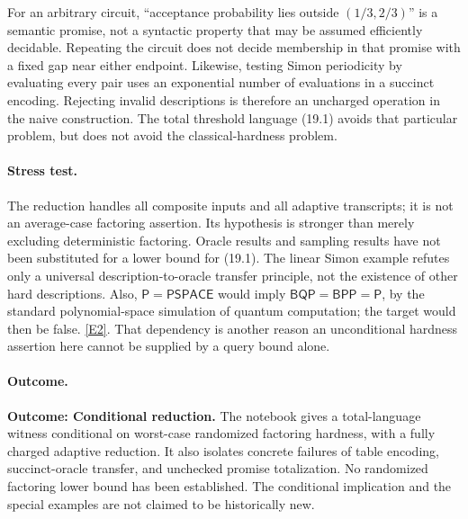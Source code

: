 \documentclass[11pt,a4paper]{article}
\newcommand{\eref}[2]{\hyperlink{extra:#1:#2}{[E#2]}}
\begin{document}
For an arbitrary circuit, ``acceptance probability lies outside
$(1/3,2/3)$'' is a semantic promise, not a syntactic property that may be
assumed efficiently decidable. Repeating the circuit does not decide
membership in that promise with a fixed gap near either endpoint.
Likewise, testing Simon periodicity by evaluating every pair uses an
exponential number of evaluations in a succinct encoding. Rejecting
invalid descriptions is therefore an uncharged operation in the naive
construction. The total threshold language (19.1) avoids that particular
problem, but does not avoid the classical-hardness problem.

\paragraph{Stress test.}
The reduction handles all composite inputs and all adaptive transcripts;
it is not an average-case factoring assertion. Its hypothesis is stronger
than merely excluding deterministic factoring. Oracle results and sampling
results have not been substituted for a lower bound for (19.1). The
linear Simon example refutes only a universal description-to-oracle
transfer principle, not the existence of other hard descriptions.
Also, $\mathsf P=\mathsf{PSPACE}$ would imply
$\mathsf{BQP}=\mathsf{BPP}=\mathsf P$, by the standard polynomial-space
simulation of quantum computation; the target would then be false.
\eref{30006683}{2}. That dependency is another reason an unconditional
hardness assertion here cannot be supplied by a query bound alone.

\paragraph{Outcome.}
\textbf{Outcome: Conditional reduction.}
The notebook gives a total-language witness conditional on worst-case
randomized factoring hardness, with a fully charged adaptive reduction.
It also isolates concrete failures of table encoding, succinct-oracle
transfer, and unchecked promise totalization. No randomized factoring
lower bound has been established. The conditional implication and the
special examples are not claimed to be historically new.
\end{document}
